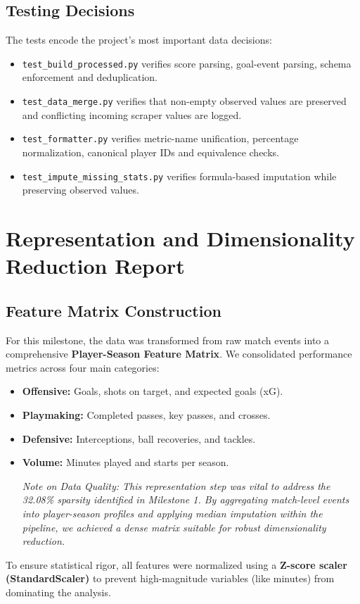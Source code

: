 \documentclass[12pt,a4paper]{article}
\begin{document}
\subsection{Testing Decisions}
The tests encode the project's most important data decisions:
\begin{itemize}
    \item \texttt{test\_build\_processed.py} verifies score parsing, goal-event parsing, schema enforcement and deduplication.
    \item \texttt{test\_data\_merge.py} verifies that non-empty observed values are preserved and conflicting incoming scraper values are logged.
    \item \texttt{test\_formatter.py} verifies metric-name unification, percentage normalization, canonical player IDs and equivalence checks.
    \item \texttt{test\_impute\_missing\_stats.py} verifies formula-based imputation while preserving observed values.
\end{itemize}

\section{Representation and Dimensionality Reduction Report}

\subsection{Feature Matrix Construction}
For this milestone, the data was transformed from raw match events into a comprehensive \textbf{Player-Season Feature Matrix}. We consolidated performance metrics across four main categories:
\begin{itemize}
    \item \textbf{Offensive:} Goals, shots on target, and expected goals (xG).
    \item \textbf{Playmaking:} Completed passes, key passes, and crosses.
    \item \textbf{Defensive:} Interceptions, ball recoveries, and tackles.
    \item \textbf{Volume:} Minutes played and starts per season.

\textit{Note on Data Quality: This representation step was vital to address the 32.08\% sparsity identified in Milestone 1. By aggregating match-level events into player-season profiles and applying median imputation within the pipeline, we achieved a dense matrix suitable for robust dimensionality reduction.}

\end{itemize}
To ensure statistical rigor, all features were normalized using a \textbf{Z-score scaler (StandardScaler)} to prevent high-magnitude variables (like minutes) from dominating the analysis.
\end{document}
